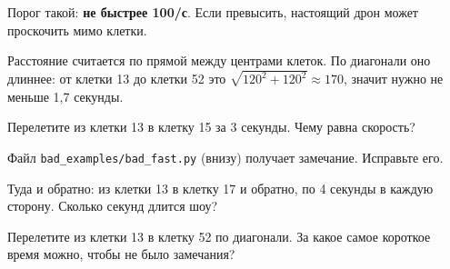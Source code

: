 Порог такой: \textbf{не быстрее 100\cm/с}. Если превысить, настоящий дрон может проскочить мимо клетки.

\begin{zametka}
Расстояние считается по прямой между центрами клеток. По диагонали оно длиннее: от клетки 13 до клетки 52 это $\sqrt{120^2 + 120^2}\approx 170$\cm, значит нужно не меньше 1,7 секунды.
\end{zametka}

\begin{probuy}
  \item Перелетите из клетки 13 в клетку 15 за 3 секунды. Чему равна скорость?
  \item Файл \texttt{bad\_examples/bad\_fast.py} (внизу) получает замечание. Исправьте его.
  \item Туда и обратно: из клетки 13 в клетку 17 и обратно, по 4 секунды в каждую сторону. Сколько секунд длится шоу?
  \item Перелетите из клетки 13 в клетку 52 по диагонали. За какое самое короткое время можно, чтобы не было замечания?
\end{probuy}
